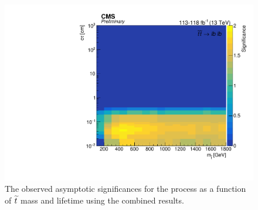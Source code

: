 \begin{figure}[hbtp]
\centering
\includegraphics[scale=0.5]{figures/results/significance_combined_lb.pdf}
\caption{The observed asymptotic significances for the \stoptolb process as a function of $\widetilde{t}$ mass and lifetime using the combined results.}
\label{significance_combined_lb}
\end{figure}

